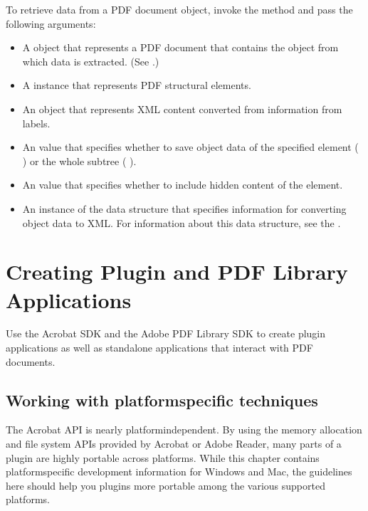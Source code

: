 \documentclass[letterpaper,12pt,english,openany,oneside]{sphinxmanual}
\begin{document}
To retrieve data from a PDF document object, invoke the  method and pass the following arguments:
\begin{itemize}
\item {} 
A  object that represents a PDF document that contains the object from which data is extracted. (See .)

\item {} 
A  instance that represents PDF structural elements.

\item {} 
An  object that represents XML content converted from information from labels.

\item {} 
An  value that specifies whether to save object data of the specified element ( ) or the whole subtree ( ).

\item {} 
An  value that specifies whether to include hidden content of the element.

\item {} 
An instance of the  data structure that specifies information for converting object data to XML. For information about this data structure, see the .

\end{itemize}


\chapter{Creating Plugin and PDF Library Applications}
\label{\detokenize{Plugins_CreatingSimplePlug:creating-plugin-and-pdf-library-applications}}\label{\detokenize{Plugins_CreatingSimplePlug::doc}}
Use the Acrobat SDK and the Adobe PDF Library SDK to create plugin applications as well as stand\sphinxhyphen{}alone applications that interact with PDF documents.


\section{Working with platform\sphinxhyphen{}specific techniques}
\label{\detokenize{Plugins_CreatingSimplePlug:working-with-platform-specific-techniques}}
The Acrobat API is nearly platform\sphinxhyphen{}independent. By using the memory allocation and file system APIs provided by Acrobat or Adobe Reader, many parts of a plugin are highly portable across platforms. While this chapter contains platform\sphinxhyphen{}specific development information for Windows and Mac, the guidelines here should help you plugins more portable among the various supported platforms.
\end{document}
